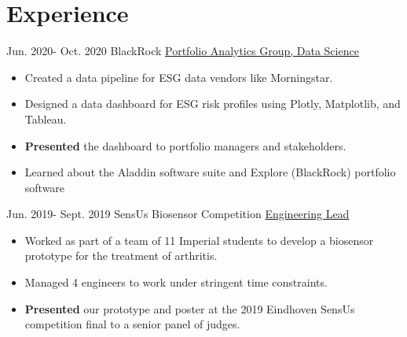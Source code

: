 \documentclass[letterpaper]{twentysecondcv} %
\begin{document}
\section{Experience}
\begin{twenty}
    \twentyitem
        {Jun. 2020-}
        {Oct. 2020}
        {BlackRock}
        {\href{http://www.blackrock.com}{Portfolio Analytics Group, Data Science}}
        {}
        {\vspace{-1mm} \begin{itemize}
            \item Created a data pipeline for ESG data vendors like Morningstar. 
            \item Designed a data dashboard for ESG risk profiles using Plotly, Matplotlib, and Tableau.
            \item \textbf{Presented} the dashboard to portfolio managers and stakeholders. 
            \item Learned about the Aladdin software suite and Explore (BlackRock) portfolio software
        \end{itemize}
        }
    \end{twenty}
    
\begin{twenty}
    \twentyitem
        {Jun. 2019-}
        {Sept. 2019}
        {SensUs Biosensor Competition}
        {\href{http://www.sensus.org}{Engineering Lead}}
        {}
        {\vspace{-1mm} \begin{itemize}
            \item Worked as part of a team of 11 Imperial students to develop a biosensor prototype for the treatment of arthritis. 
            \item Managed 4 engineers to work under stringent time constraints.
            \item \textbf{Presented} our prototype and poster at the 2019 Eindhoven SensUs competition final to a senior panel of judges. \vspace{1mm}
        \end{itemize}
        }
    \end{twenty}
    
\end{document}
